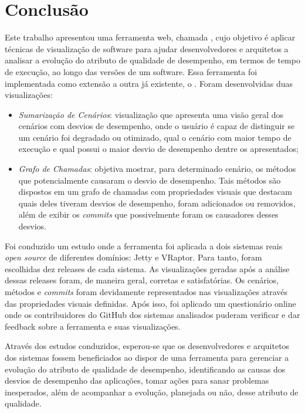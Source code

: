 \chapter{Conclusão} \label{ch:conclusao}

Este trabalho apresentou uma ferramenta web, chamada \textit{\toolName}, cujo objetivo é aplicar técnicas de visualização de software para ajudar desenvolvedores e arquitetos a analisar a evolução do atributo de qualidade de desempenho, em termos de tempo de execução, ao longo das versões de um software. Essa ferramenta foi implementada como extensão a outra já existente, o \textit{\perfMinerName}. Foram desenvolvidas duas visualizações:
\begin{itemize}
	\item \textit{Sumarização de Cenários}: visualização que apresenta uma visão geral dos cenários com desvios de desempenho, onde o usuário é capaz de distinguir se um cenário foi degradado ou otimizado, qual o cenário com maior tempo de execução e qual possui o maior desvio de desempenho dentre os apresentados;
	\item \textit{Grafo de Chamadas}: objetiva mostrar, para determinado cenário, os métodos que potencialmente causaram o desvio de desempenho. Tais métodos são dispostos em um grafo de chamadas com propriedades visuais que destacam quais deles tiveram desvios de desempenho, foram adicionados ou removidos, além de exibir os \textit{commits} que possivelmente foram os causadores desses desvios.
\end{itemize}

Foi conduzido um estudo onde a ferramenta foi aplicada a dois sistemas reais \textit{open source} de diferentes domínios: Jetty e VRaptor. Para tanto, foram escolhidas dez releases de cada sistema. As visualizações geradas após a análise dessas releases foram, de maneira geral, corretas e satisfatórias. Os cenários, métodos e \textit{commits} foram devidamente representados nas visualizações através das propriedades visuais definidas. Após isso, foi aplicado um questionário online onde os contribuidores do GitHub dos sistemas analisados puderam verificar e dar feedback sobre a ferramenta e suas visualizações.

Através dos estudos conduzidos, esperou-se que os desenvolvedores e arquitetos dos sistemas fossem beneficiados ao dispor de uma ferramenta para gerenciar a evolução do atributo de qualidade de desempenho, identificando as causas dos desvios de desempenho das aplicações, tomar ações para sanar problemas inesperados, além de acompanhar a evolução, planejada ou não, desse atributo de qualidade.

